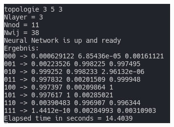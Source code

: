 \begin{minipage}{\linewidth}
	\centering
	\includegraphics[width=0.8\linewidth]{images/sc}
\end{minipage}
